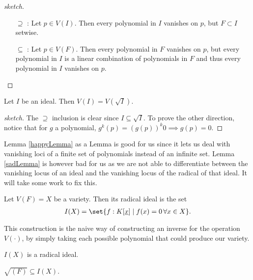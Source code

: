 \begin{proof}[sketch]
\phantom{.}
\begin{enumerate}
    \item[$\supseteq$] : Let $p \in V(I)$. Then every polynomial in $I$ vanishes on $p$, but $F \subset I$ setwise.
    \item[$\subseteq$] : Let $p \in V(F)$. Then every polynomial in $F$ vanishes on $p$, but every polynomial in $I $ is a linear combination of polynomials in $F$ and thus every polynomial in $I $ vanishes on $p$.
\end{enumerate}
\end{proof}

\begin{lemma}\label{sadLemma}
Let $I$ be an ideal. Then $V(I) = V(\sqrt{I})$.
\end{lemma}

\begin{proof}[sketch]
The $\supseteq$ inclusion is clear since $I \subseteq \sqrt{I}$. To prove the other direction, notice that for $g$ a polynomial, $g^k( p) = \left( g(p)\right) ^k 0 \implies g(p) = 0$.
\end{proof}

Lemma \ref{happyLemma} as a Lemma is good for us since it lets us deal with vanishing loci of a finite set of polynomials instead of an infinite set. Lemma \ref{sadLemma} is however bad for us as we are not able to differentiate between the vanishing locus of an ideal and the vanishing locus of the radical of that ideal. It will take some work to fix this.

\begin{definition}
Let $V(F) = X$ be a variety. Then its radical ideal is the set
\begin{align*}
    I(X) = \set{ f : K[ \underline{x} ] \mid f(x) = 0 \, \forall x \in X}.
\end{align*}
\end{definition}


This construction is the naive way of constructing an inverse for the operation $V( \cdot )$, by simply taking each possible polynomial that could produce our variety.

\begin{lemma}
$I(X) $ is a radical ideal.
\end{lemma}

\begin{lemma}
$\sqrt{ (F) } \subseteq I(X)$.
\end{lemma}


